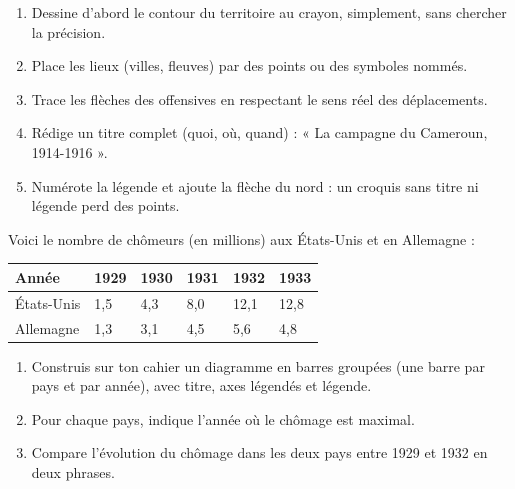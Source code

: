 \documentclass[11pt]{article}
\begin{document}
\begin{methode}
\begin{enumerate}
\item Dessine d'abord le contour du territoire au crayon, simplement, sans chercher la précision.
\item Place les lieux (villes, fleuves) par des points ou des symboles nommés.
\item Trace les flèches des offensives en respectant le sens réel des déplacements.
\item Rédige un titre complet (quoi, où, quand) : « La campagne du Cameroun, 1914-1916 ».
\item Numérote la légende et ajoute la flèche du nord : un croquis sans titre ni légende perd des points.
\end{enumerate}
\end{methode}

\begin{exercice}
Voici le nombre de chômeurs (en millions) aux États-Unis et en Allemagne :
\begin{center}
\begin{tabularx}{\linewidth}{|l|X|X|X|X|X|}
\hline
\rowcolor{popblueL} Année & 1929 & 1930 & 1931 & 1932 & 1933 \\
\hline
États-Unis & 1,5 & 4,3 & 8,0 & 12,1 & 12,8 \\
\hline
Allemagne & 1,3 & 3,1 & 4,5 & 5,6 & 4,8 \\
\hline
\end{tabularx}
\end{center}
\begin{enumerate}
\item Construis sur ton cahier un diagramme en barres groupées (une barre par pays et par année), avec titre, axes légendés et légende.
\item Pour chaque pays, indique l'année où le chômage est maximal.
\item Compare l'évolution du chômage dans les deux pays entre 1929 et 1932 en deux phrases.
\end{enumerate}
\end{exercice}
\end{document}
